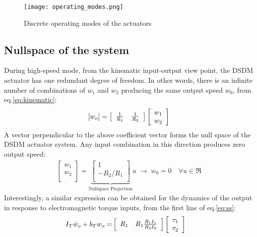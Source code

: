 \begin{figure}[H]
	\centering
		\texttt{[image: operating\_modes.png]}
	\caption{Discrete operating modes of the actuators}
	\label{fig:operatingmodes}
\end{figure}



\subsection{Nullspace of the system}

During high-speed mode, from the kinematic input-output view point, the DSDM actuator has one redundant degree of freedom. In other words, there is an infinite number of combinations of $w_1$ and $w_2$ producing the same output speed $w_0$, from eq.\eqref{eq:kinematic}:  
%
\begin{align}
\left[
w_o
\right] = 
\left[
\begin{array}{c c}
\frac{1}{R_1} & \frac{1}{R_2}
\end{array}
\right]
\left[
\begin{array}{c}
w_1 \\
w_2 \\
\end{array}
\right]
\end{align}
%
A vector perpendicular to the above coefficient vector forms the null space of the DSDM actuator system. Any input combination in this direction produces zero output speed:
%
\begin{align}
\left[
\begin{array}{c}
w_1 \\
w_2 \\
\end{array}
\right]=
\underbrace{\left[
\begin{array}{c}
1 \\
-R_2/R_1 \\
\end{array}
\right]}_{\text{Nullspace Projection}}
u  \; \rightarrow \;
w_0 = 0 \quad \forall u \in \Re
\label{eq:kinematicnullspace}
\end{align}
%
Interestingly, a similar expression can be obtained for the dynamics of the output in response to electromagnetic torque inputs, from the first line of eq.\eqref{eq:ss}:
%
\begin{align}
I_T \dot{w}_o +
b_T  w_o
=&
\left[ \begin{array}{c c}
R_1 & R_1 \frac{R_1 I_1}{R_2 I_2}
\end{array} \right]
\left[ \begin{array}{c}
\tau_1 \\
\tau_2
\end{array} \right]
\label{eq:output}
\end{align}
